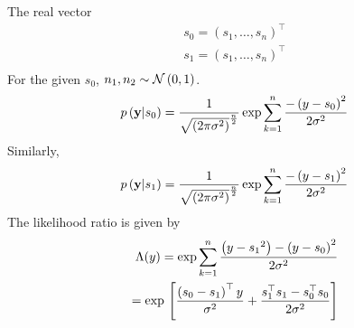 \begin{enumerate}



\solution
The real vector  \begin{align}
s_0 =(s_1,\dots,s_n)^\top \\
s_1 =(s_1,\dots,s_n)^\top \\
\end{align}
For the given $s_0$, $n_1,n_2 \sim \mathcal{N}\left(0,1\right)$.
\begin{align}
p\left(\mathbf{y}|s_0\right)=\frac{1}{\sqrt{\left(2\pi\sigma^2\right)}^\frac{n}{2}}\exp\sum_{k=1}^{n}\frac{-\left(y - s_0\right)^2}{2\sigma^2}
\end{align}
Similarly, 
\begin{align}
p\left(\mathbf{y}|s_1\right)=\frac{1}{\sqrt{\left(2\pi\sigma^2\right)}^\frac{n}{2}}\exp\sum_{k=1}^{n}\frac{-\left(y - s_1\right)^2}{2\sigma^2}
\end{align}
The likelihood ratio is given by 
\begin{align}
\Lambda(y) = \exp\sum_{k=1}^{n}\frac{\left({y - s_1}^2\right)-\left(y-s_0\right)^2}{2\sigma^2} \\
= \exp{}\left[\frac{\left( s_0 -s_1\right)^\top y}{\sigma^2}+\frac{s_1^\top s_1 - s_0^\top s_0}{2\sigma^2}\right]
\label{eq:llr}
\end{align}


\end{enumerate}
